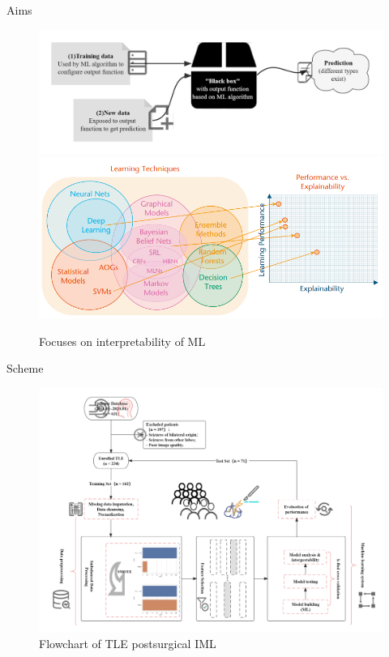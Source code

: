 \documentclass[
  11pt,
  ignorenonframetext,
  fontset=fandol]{beamer}
\begin{document}
\begin{frame}{Aims}
\protect\hypertarget{aims}{}
\begin{figure}

{\centering \includegraphics[width=0.75\linewidth]{images/Black-box} \includegraphics[width=0.85\linewidth]{images/xai} 

}

\caption{Focuses on interpretability of ML}\label{fig:unnamed-chunk-3}
\end{figure}
\end{frame}

\begin{frame}{Scheme}
\protect\hypertarget{scheme}{}
\begin{figure}

{\centering \includegraphics[width=0.95\linewidth]{images/TLE_EML_Flow} 

}

\caption{Flowchart of TLE postsurgical IML}\label{fig:unnamed-chunk-4}
\end{figure}
\end{frame}
\end{document}
